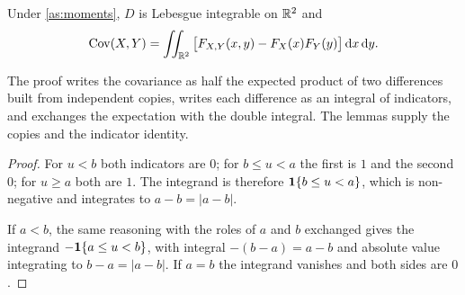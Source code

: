 \documentclass{saim-blog}
\begin{document}
\begin{mainresult}
\begin{theorem}[Hoeffding, 1940]\label{thm:main}
Under \cref{as:moments}, $D$ is Lebesgue integrable on $\mathbb{R}^2$ and
\begin{equation}\label{eq:main}
\operatorname{Cov}(X,Y)=\iint_{\mathbb{R}^2}\big[F_{X,Y}(x,y)-F_X(x)F_Y(y)\big]\mathop{}\!\mathrm{d} x\mathop{}\!\mathrm{d} y .
\end{equation}
\end{theorem}
\end{mainresult}


\SecProof

The proof writes the covariance as half the expected product of two differences built from independent copies, writes each difference as an integral of indicators, and exchanges the expectation with the double integral. The lemmas supply the copies and the indicator identity.

\begin{proof}
For $u<b$ both indicators are $0$; for $b\le u<a$ the first is $1$ and the second $0$; for $u\ge a$ both are $1$. The integrand is therefore $\mathbf{1}\{b\le u<a\}$, which is non-negative and integrates to $a-b=|a-b|$.

If $a<b$, the same reasoning with the roles of $a$ and $b$ exchanged gives the integrand $-\mathbf{1}\{a\le u<b\}$, with integral $-(b-a)=a-b$ and absolute value integrating to $b-a=|a-b|$. If $a=b$ the integrand vanishes and both sides are $0$.
\end{proof}
\end{document}
